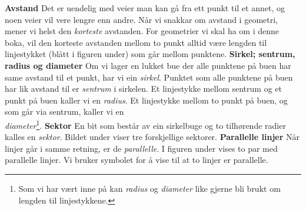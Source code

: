 \newpage
{}
\newpage
\textbf{Avstand}\os
Det er uendelig med veier man kan gå fra ett punkt til et annet, og noen veier vil vere lengre enn andre. Når vi snakkar om avstand i geometri, mener vi helst den \textsl{korteste} avstanden. For geometrier vi skal ha om i denne boka, vil den korteste avstanden mellom to punkt alltid være lengden til linjestykket (blått i figuren under) som går mellom punktene.
\textbf{Sirkel; sentrum, radius og diameter} \os
Om vi lager en lukket bue der alle punktene på buen har same avstand til et punkt, har vi ein \textit{sirkel}. Punktet som alle punktene på buen har lik avstand til er \textit{sentrum} i sirkelen. Et linjestykke mellom sentrum og et punkt på buen kaller vi en \textit{radius}. Et linjestykke mellom to punkt på buen, og som går via sentrum, kaller vi en\\ \textit{diameter}\footnote{Som vi har vært inne på kan \textit{radius} og \textit{diameter} like gjerne bli brukt om lengden til linjestykkene.}.
\textbf{Sektor} \os
En bit som består av ein sirkelbuge og to tilhørende radier kalles en \textit{sektor}. Bildet under viser tre forskjellige sektorer.
\newpage
\textbf{Parallelle linjer}\os
Når linjer går i samme retning, er de \textit{parallelle}. I figuren under vises to par med parallelle linjer.
Vi bruker symbolet \sym{$ \parallel $} for å vise til at to linjer er parallelle.
